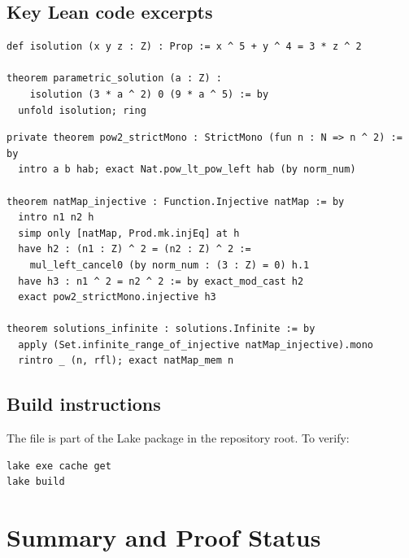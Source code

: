 \documentclass[12pt,a4paper]{article}
\theoremstyle{definition}
\begin{document}
\subsection{Key Lean code excerpts}

\begin{lstlisting}[language=Lean4,caption={The equation and primary family verification}]
def isolution (x y z : Z) : Prop := x ^ 5 + y ^ 4 = 3 * z ^ 2

theorem parametric_solution (a : Z) :
    isolution (3 * a ^ 2) 0 (9 * a ^ 5) := by
  unfold isolution; ring
\end{lstlisting}

\begin{lstlisting}[language=Lean4,caption={Injectivity and infinitude}]
private theorem pow2_strictMono : StrictMono (fun n : N => n ^ 2) := by
  intro a b hab; exact Nat.pow_lt_pow_left hab (by norm_num)

theorem natMap_injective : Function.Injective natMap := by
  intro n1 n2 h
  simp only [natMap, Prod.mk.injEq] at h
  have h2 : (n1 : Z) ^ 2 = (n2 : Z) ^ 2 :=
    mul_left_cancel0 (by norm_num : (3 : Z) = 0) h.1
  have h3 : n1 ^ 2 = n2 ^ 2 := by exact_mod_cast h2
  exact pow2_strictMono.injective h3

theorem solutions_infinite : solutions.Infinite := by
  apply (Set.infinite_range_of_injective natMap_injective).mono
  rintro _ (n, rfl); exact natMap_mem n
\end{lstlisting}

\subsection{Build instructions}

The file is part of the Lake package in the repository root.  To verify:
\begin{lstlisting}[language=bash]
lake exe cache get
lake build
\end{lstlisting}

\section{Summary and Proof Status}\label{sec:summary}
\end{document}

